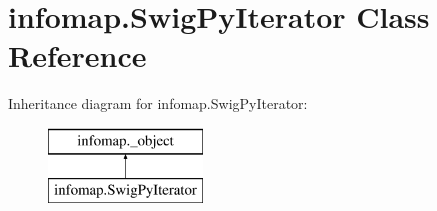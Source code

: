 \hypertarget{classinfomap_1_1SwigPyIterator}{}\section{infomap.\+Swig\+Py\+Iterator Class Reference}
\label{classinfomap_1_1SwigPyIterator}
Inheritance diagram for infomap.\+Swig\+Py\+Iterator\+:\begin{figure}[H]
\begin{center}
\leavevmode
\includegraphics[height=2.000000cm]{classinfomap_1_1SwigPyIterator}
\end{center}
\end{figure}

